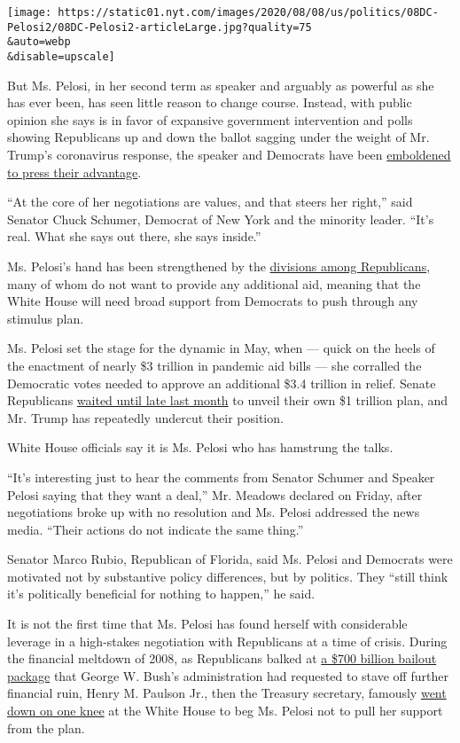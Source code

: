\texttt{[image: https://static01.nyt.com/images/2020/08/08/us/politics/08DC-Pelosi2/08DC-Pelosi2-articleLarge.jpg?quality=75\\\&auto=webp\\\&disable=upscale]}

But Ms. Pelosi, in her second term as speaker and arguably as powerful
as she has ever been, has seen little reason to change course. Instead,
with public opinion she says is in favor of expansive government
intervention and polls showing Republicans up and down the ballot
sagging under the weight of Mr. Trump's coronavirus response, the
speaker and Democrats have been
\href{https://www.nytimes.com/2020/04/23/us/coronavirus-democrats-strategy.html}{emboldened
to press their advantage}.

``At the core of her negotiations are values, and that steers her
right,'' said Senator Chuck Schumer, Democrat of New York and the
minority leader. ``It's real. What she says out there, she says
inside.''

Ms. Pelosi's hand has been strengthened by the
\href{https://www.nytimes.com/2020/07/22/us/politics/coronavirus-stimulus.html}{divisions
among Republicans}, many of whom do not want to provide any additional
aid, meaning that the White House will need broad support from Democrats
to push through any stimulus plan.

Ms. Pelosi set the stage for the dynamic in May, when --- quick on the
heels of the enactment of nearly \$3 trillion in pandemic aid bills ---
she corralled the Democratic votes needed to approve an additional \$3.4
trillion in relief. Senate Republicans
\href{https://www.nytimes.com/2020/05/15/us/coronavirus-republicans-blowback-aid.html}{waited
until late last month} to unveil their own \$1 trillion plan, and Mr.
Trump has repeatedly undercut their position.

White House officials say it is Ms. Pelosi who has hamstrung the talks.

``It's interesting just to hear the comments from Senator Schumer and
Speaker Pelosi saying that they want a deal,'' Mr. Meadows declared on
Friday, after negotiations broke up with no resolution and Ms. Pelosi
addressed the news media. ``Their actions do not indicate the same
thing.''

Senator Marco Rubio, Republican of Florida, said Ms. Pelosi and
Democrats were motivated not by substantive policy differences, but by
politics. They ``still think it's politically beneficial for nothing to
happen,'' he said.

It is not the first time that Ms. Pelosi has found herself with
considerable leverage in a high-stakes negotiation with Republicans at a
time of crisis. During the financial meltdown of 2008, as Republicans
balked at
\href{http://archive.nytimes.com/www.nytimes.com/packages/html/national/200904_CREDITCRISIS/recipients.html}{a
\$700 billion bailout package} that George W. Bush's administration had
requested to stave off further financial ruin, Henry M. Paulson Jr.,
then the Treasury secretary, famously
\href{https://www.nytimes.com/2008/09/26/business/26bailout.html}{went
down on one knee} at the White House to beg Ms. Pelosi not to pull her
support from the plan.

